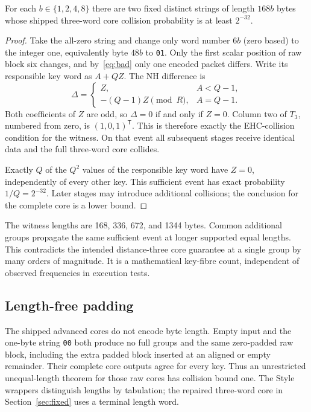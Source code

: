\begin{proposition}\label{prop:bad}
For each $b\in\{1,2,4,8\}$ there are two fixed distinct strings of length $168b$ bytes whose shipped three-word core collision probability is at least $2^{-32}$.
\end{proposition}
\begin{proof}
Take the all-zero string and change only word number $6b$ (zero based) to the integer one, equivalently byte $48b$ to \texttt{01}. Only the first scalar position of raw block six changes, and by~\eqref{eq:bad} only one encoded packet differs. Write its responsible key word as $A+QZ$. The NH difference is
\begin{equation}\label{eq:witness}
 \Delta=\begin{cases}Z,&A<Q-1,\\-(Q-1)Z\pmod R,&A=Q-1.
 \end{cases}
\end{equation}
Both coefficients of $Z$ are odd, so $\Delta=0$ if and only if $Z=0$. Column two of $T_3$, numbered from zero, is $(1,0,1)^{\mathsf T}$. This is therefore exactly the EHC-collision condition for the witness. On that event all subsequent stages receive identical data and the full three-word core collides.

Exactly $Q$ of the $Q^2$ values of the responsible key word have $Z=0$, independently of every other key. This sufficient event has exact probability $1/Q=2^{-32}$. Later stages may introduce additional collisions; the conclusion for the complete core is a lower bound.
\end{proof}
The witness lengths are 168, 336, 672, and 1344 bytes. Common additional groups propagate the same sufficient event at longer supported equal lengths. This contradicts the intended distance-three core guarantee at a single group by many orders of magnitude. It is a mathematical key-fibre count, independent of observed frequencies in execution tests.

\subsection{Length-free padding}
The shipped advanced cores do not encode byte length. Empty input and the one-byte string \texttt{00} both produce no full groups and the same zero-padded raw block, including the extra padded block inserted at an aligned or empty remainder. Their complete core outputs agree for every key. Thus an unrestricted unequal-length theorem for those raw cores has collision bound one. The Style wrappers distinguish lengths by tabulation; the repaired three-word core in Section~\ref{sec:fixed} uses a terminal length word.


